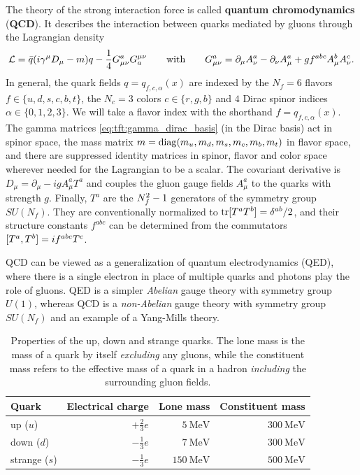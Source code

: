 The theory of the strong interaction force is called \textbf{quantum chromodynamics} (\textbf{QCD}).
It describes the interaction between quarks mediated by gluons through the Lagrangian density
\begin{equation}
	\mathcal{L} = \bar{q} ( i \gamma^\mu D_\mu - m ) q - \frac14 G_{\mu\nu}^a G^{\mu\nu}_a
	\qquad \text{with} \qquad
	G_{\mu\nu}^a = \partial_\mu A_\nu^a - \partial_\nu A_\mu^a + g f^{abc} A_\mu^b A_\nu^c.
\label{eq:qcd:lagrangian}
\end{equation}
In general,
the quark fields $q = q_{f,c,\alpha}(x)$ are indexed by
the $N_f = 6$ flavors $f \in \{u,d,s,c,b,t\}$,
the $N_c = 3$ colors $c \in \{r,g,b\}$ and
$4$ Dirac spinor indices $\alpha \in \{0,1,2,3\}$.
We will take a flavor index with the shorthand $f = q_{f,c,\alpha}(x)$.
The gamma matrices \eqref{eq:tft:gamma_dirac_basis} (in the Dirac basis) act in spinor space,
the mass matrix $m = \operatorname{diag}(m_u, m_d, m_s, m_c, m_b, m_t)$ in flavor space,
and there are suppressed identity matrices in spinor, flavor and color space wherever needed for the Lagrangian to be a scalar.
The covariant derivative is $D_\mu = \partial_\mu - i g A_\mu^a T^a$ and couples the gluon gauge fields $A_\mu^a$ to the quarks with strength $g$.
Finally, $T^a$ are the $\smash{N_f^2} - 1$ generators of the symmetry group $SU(N_f)$.
They are conventionally normalized to $\operatorname{tr}[T^a T^b] = \delta^{ab}/2$,
and their structure constants $f^{abc}$ can be determined from the commutators $[ T^a , T^b ] = i f^{abc} T^c$.

QCD can be viewed as a generalization of quantum electrodynamics (QED),
where there is a single electron in place of multiple quarks and photons play the role of gluons.
QED is a simpler \emph{Abelian} gauge theory with symmetry group $U(1)$,
whereas QCD is a \emph{non-Abelian} gauge theory with symmetry group $SU(N_f)$ and an example of a Yang-Mills theory.

\begin{table}[b]
\centering
\caption{\label{tab:qcd:quark_properties}%
	Properties of the up, down and strange quarks.
	The lone mass is the mass of a quark by itself \emph{excluding} any gluons,
	while the constituent mass refers to the effective mass of a quark in a hadron \emph{including} the surrounding gluon fields.
	\cite{ref:pdg_review_2021,ref:glendenning}
}
{ \renewcommand{\arraystretch}{1.2} %
\begin{tabular}{ l r r r }
	\toprule
	Quark & Electrical charge & Lone mass & Constituent mass \\
	\midrule
	up ($u$) & $+\frac23 e$ & $\SI{5}{\mega\electronvolt}$ & \approx \, $\SI{300}{\mega\electronvolt}$ \\
	down ($d$) & $-\frac13 e$ & $\SI{7}{\mega\electronvolt}$ & \approx \, $\SI{300}{\mega\electronvolt}$ \\
	strange ($s$) & $-\frac13 e$ & $\SI{150}{\mega\electronvolt}$ & \approx \, $\SI{500}{\mega\electronvolt}$ \\
	\bottomrule
\end{tabular} }
\end{table}

